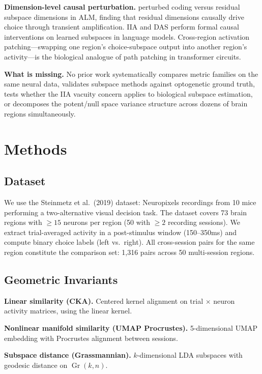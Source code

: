 \documentclass{article}
\begin{document}
\textbf{Dimension-level causal perturbation.} \citet{pereira2025residual} perturbed coding versus residual subspace dimensions in ALM, finding that residual dimensions causally drive choice through transient amplification. IIA \citep{geiger2024finding} and DAS \citep{geiger2024causal} perform formal causal interventions on learned subspaces in language models. Cross-region activation patching---swapping one region's choice-subspace output into another region's activity---is the biological analogue of path patching in transformer circuits.

\textbf{What is missing.} No prior work systematically compares metric families on the same neural data, validates subspace methods against optogenetic ground truth, tests whether the IIA vacuity concern applies to biological subspace estimation, or decomposes the potent/null space variance structure across dozens of brain regions simultaneously.

\section{Methods}

\subsection{Dataset}

We use the Steinmetz et al.\ (2019) dataset: Neuropixels recordings from 10 mice performing a two-alternative visual decision task. The dataset covers 73 brain regions with $\geq 15$ neurons per region (50 with $\geq 2$ recording sessions). We extract trial-averaged activity in a post-stimulus window (150--350ms) and compute binary choice labels (left vs.\ right). All cross-session pairs for the same region constitute the comparison set: 1,316 pairs across 50 multi-session regions.

\subsection{Geometric Invariants}

\textbf{Linear similarity (CKA).} Centered kernel alignment \citep{kornblith2019similarity} on trial $\times$ neuron activity matrices, using the linear kernel.

\textbf{Nonlinear manifold similarity (UMAP Procrustes).} 5-dimensional UMAP embedding \citep{mcinnes2018umap} with Procrustes alignment between sessions.

\textbf{Subspace distance (Grassmannian).} $k$-dimensional LDA subspaces with geodesic distance on $\operatorname{Gr}(k, n)$.
\end{document}
